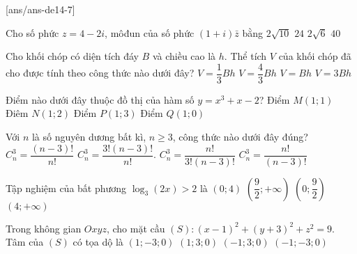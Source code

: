 
\begin{name}
	{\tenchude}
	{\tendethi}
	{\tentruong}
	{\thoigian}
\end{name}
[ans/ans-de14-7]

\begin{ex}%
Cho số phức $z=4-2 i$, môđun của số phức $(1+i) \bar{z}$ bằng
\choice
{\True $2\sqrt{10}$}
{$24$}
{$2\sqrt{6}$}
{$40$}

\end{ex}
\begin{ex}%
Cho khối chóp có diện tích đáy $B$ và chiều cao là $h$. Thể tích $V$ của khối chóp đã cho được tính theo công thức nào dưới đây?
\choice
{\True $V=\dfrac{1}{3} B h$}
{$V=\dfrac{4}{3} B h$}
{$V=B h$}
{$V=3 B h$}

\end{ex}
\begin{ex}%
Điểm nào dưới đây thuộc đồ thị của hàm số $y=x^3+x-2$?
\choice
{Điểm $M(1; 1)$}
{Điêm $N(1; 2)$}
{Điểm $P(1; 3)$}
{\True Điểm $Q(1; 0)$}

\end{ex}
\begin{ex}%
Với $n$ là số nguyên dương bất kì, $n \geq 3$, công thức nào dưới đây đúng?
\choice
{$C_n^3=\dfrac{(n-3) !}{n !}$}
{$C_n^3=\dfrac{3!(n-3) !}{n !}.$}
{$C_n^3=\dfrac{n !}{3!(n-3) !}$}
{\True $C_n^3=\dfrac{n !}{(n-3) !}$}

\end{ex}
\begin{ex}%
Tập nghiệm của bất phương $\log_3(2 x)>2$ là
\choice
{$(0; 4)$}
{\True $\left(\dfrac{9}{2};+\infty\right)$}
{$\left(0; \dfrac{9}{2}\right)$}
{$(4;+\infty)$}

\end{ex}
\begin{ex}%
Trong không gian $O x y z$, cho mặt cầu $(S)\colon(x-1)^2+(y+3)^2+z^2=9$. Tâm của $(S)$ có tọa dộ là
\choice
{\True $(1;-3; 0)$}
{$(1; 3; 0)$}
{$(-1; 3; 0)$}
{$(-1;-3; 0)$}

\end{ex}
\begin{ex}%
{\vspace{-0.5cm}
}

\end{ex}
